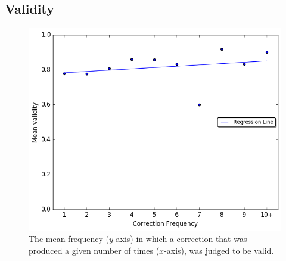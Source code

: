 \documentclass[letterpaper, 11pt]{article}
\begin{document}
\subsection{Validity}\label{ap:validity_judgements}
\begin{figure}[h!]
	\vspace{-.3cm}
	\includegraphics[width=0.9\columnwidth]{IAA_confirmation_frequency}
	\caption{The mean frequency ($y$-axis) in which a correction that was produced
		a given number of times ($x$-axis), was judged to be valid.
		 \label{fig:validity_judgements}}
		\vspace{-0.3cm}
		\end{figure}
\end{document}
